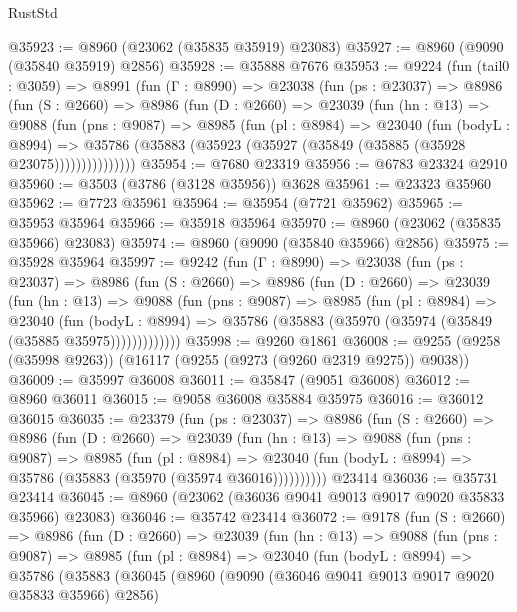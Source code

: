 \begin{lexlean}{RustStd}
\begin{coremodule}
@35923 := @8960 (@23062 (@35835 @35919) @23083)
@35927 := @8960 (@9090 (@35840 @35919) @2856)
@35928 := @35888 @7676
@35953 := @9224
    (fun (tail0 : @3059) =>
    @8991
      (fun (Γ : @8990) =>
      @23038
        (fun (ps : @23037) =>
        @8986
          (fun (S : @2660) =>
          @8986
            (fun (D : @2660) =>
            @23039
              (fun (hn : @13) =>
              @9088
                (fun (pns : @9087) =>
                @8985
                  (fun (pl : @8984) =>
                  @23040
                    (fun (bodyL : @8994) =>
                    @35786 (@35883 (@35923 (@35927 (@35849 (@35885 (@35928 @23075)))))))))))))))
@35954 := @7680 @23319
@35956 := @6783 @23324 @2910
@35960 := @3503 (@3786 (@3128 @35956)) @3628
@35961 := @23323 @35960
@35962 := @7723 @35961
@35964 := @35954 (@7721 @35962)
@35965 := @35953 @35964
@35966 := @35918 @35964
@35970 := @8960 (@23062 (@35835 @35966) @23083)
@35974 := @8960 (@9090 (@35840 @35966) @2856)
@35975 := @35928 @35964
@35997 := @9242
    (fun (Γ : @8990) =>
    @23038
      (fun (ps : @23037) =>
      @8986
        (fun (S : @2660) =>
        @8986
          (fun (D : @2660) =>
          @23039
            (fun (hn : @13) =>
            @9088
              (fun (pns : @9087) =>
              @8985
                (fun (pl : @8984) =>
                @23040
                  (fun (bodyL : @8994) =>
                  @35786 (@35883 (@35970 (@35974 (@35849 (@35885 @35975)))))))))))))
@35998 := @9260 @1861
@36008 := @9255 (@9258 (@35998 @9263)) (@16117 (@9255 (@9273 (@9260 @2319 @9275)) @9038))
@36009 := @35997 @36008
@36011 := @35847 (@9051 @36008)
@36012 := @8960 @36011
@36015 := @9058 @36008 @35884 @35975
@36016 := @36012 @36015
@36035 := @23379
    (fun (ps : @23037) =>
    @8986
      (fun (S : @2660) =>
      @8986
        (fun (D : @2660) =>
        @23039
          (fun (hn : @13) =>
          @9088
            (fun (pns : @9087) =>
            @8985
              (fun (pl : @8984) =>
              @23040 (fun (bodyL : @8994) => @35786 (@35883 (@35970 (@35974 @36016))))))))))
    @23414
@36036 := @35731 @23414
@36045 := @8960 (@23062 (@36036 @9041 @9013 @9017 @9020 @35833 @35966) @23083)
@36046 := @35742 @23414
@36072 := @9178
    (fun (S : @2660) =>
    @8986
      (fun (D : @2660) =>
      @23039
        (fun (hn : @13) =>
        @9088
          (fun (pns : @9087) =>
          @8985
            (fun (pl : @8984) =>
            @23040
              (fun (bodyL : @8994) =>
              @35786
                (@35883
                  (@36045
                    (@8960
                      (@9090 (@36046 @9041 @9013 @9017 @9020 @35833 @35966) @2856)

\end{coremodule}
\end{lexlean}
